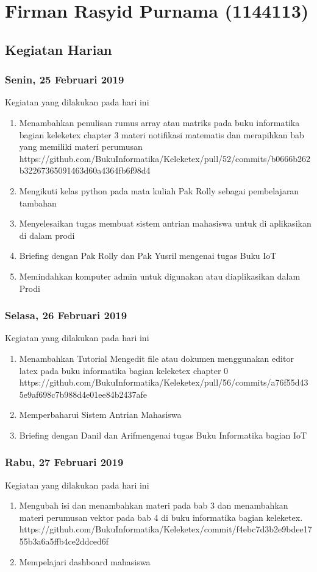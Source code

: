 \chapter{Firman Rasyid Purnama (1144113)}

\section{Kegiatan Harian}

\subsection{Senin, 25 Februari 2019}
Kegiatan yang dilakukan pada hari ini
\begin{enumerate}
\item Menambahkan penulisan rumus array atau matriks pada buku informatika bagian keleketex chapter 3 materi notifikasi matematis dan merapihkan bab yang memiliki materi perumusan
\subitem https://github.com/BukuInformatika/Keleketex/pull/52/commits/b0666b262b32267365091463d60a4364fb6f98d4
\item Mengikuti kelas python pada mata kuliah Pak Rolly sebagai pembelajaran tambahan
\item Menyelesaikan tugas membuat sistem antrian mahasiswa untuk di aplikasikan di dalam prodi
\item Briefing dengan Pak Rolly dan Pak Yusril mengenai tugas Buku IoT
\item Memindahkan komputer admin untuk digunakan atau diaplikasikan dalam Prodi
\end{enumerate}

\subsection{Selasa, 26 Februari 2019}
Kegiatan yang dilakukan pada hari ini
\begin{enumerate}
\item Menambahkan Tutorial Mengedit file atau dokumen menggunakan editor latex pada buku informatika bagian keleketex chapter 0
\subitem https://github.com/BukuInformatika/Keleketex/pull/56/commits/a76f55d435e9af698c7b988d4e01ee84b2437afe
\item Memperbaharui Sistem Antrian Mahasiswa
\item Briefing dengan Danil dan Arifmengenai tugas Buku Informatika bagian IoT
\end{enumerate}

\subsection{Rabu, 27 Februari 2019}
Kegiatan yang dilakukan pada hari ini
\begin{enumerate}
\item Mengubah isi dan menambahkan materi pada bab 3  dan menambahkan materi perumusan vektor pada bab 4 di buku informatika bagian keleketex.
\subitem https://github.com/BukuInformatika/Keleketex/commit/f4ebc7d3b2e9bdee1755b3a6a5ffb4ce2ddced6f
\item Mempelajari dashboard mahasiswa
\end{enumerate}





